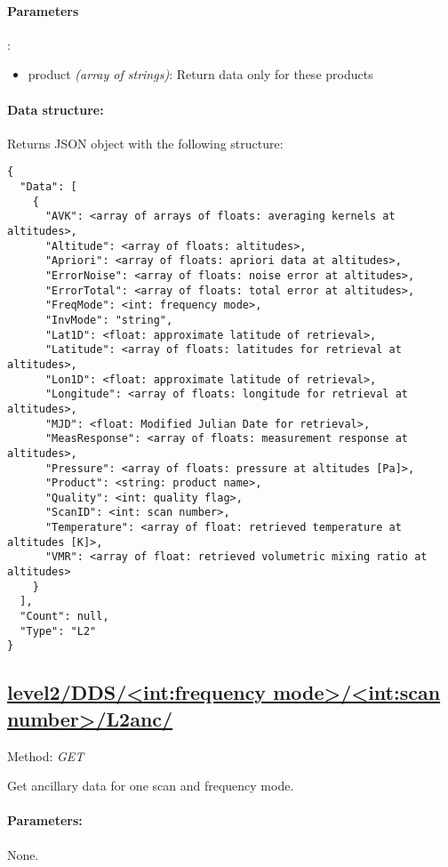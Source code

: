 \paragraph{Parameters}:
\begin{itemize}
    \item product \emph{(array of strings)}: Return data only for these
        products
\end{itemize}

\paragraph{Data structure:}
Returns JSON object with the following structure:

\begin{lstlisting}[basicstyle=\footnotesize]
{
  "Data": [
    {
      "AVK": <array of arrays of floats: averaging kernels at altitudes>,
      "Altitude": <array of floats: altitudes>,
      "Apriori": <array of floats: apriori data at altitudes>,
      "ErrorNoise": <array of floats: noise error at altitudes>,
      "ErrorTotal": <array of floats: total error at altitudes>,
      "FreqMode": <int: frequency mode>,
      "InvMode": "string",
      "Lat1D": <float: approximate latitude of retrieval>,
      "Latitude": <array of floats: latitudes for retrieval at altitudes>,
      "Lon1D": <float: approximate latitude of retrieval>,
      "Longitude": <array of floats: longitude for retrieval at altitudes>,
      "MJD": <float: Modified Julian Date for retrieval>,
      "MeasResponse": <array of floats: measurement response at altitudes>,
      "Pressure": <array of floats: pressure at altitudes [Pa]>,
      "Product": <string: product name>,
      "Quality": <int: quality flag>,
      "ScanID": <int: scan number>,
      "Temperature": <array of float: retrieved temperature at altitudes [K]>,
      "VMR": <array of float: retrieved volumetric mixing ratio at altitudes>
    }
  ],
  "Count": null,
  "Type": "L2"
}
\end{lstlisting}


\subsection{\url{level2/DDS/<int:frequency mode>/<int:scan number>/L2anc/}}
Method: \emph{GET}

Get ancillary data for one scan and frequency mode.

\paragraph{Parameters:} None.

